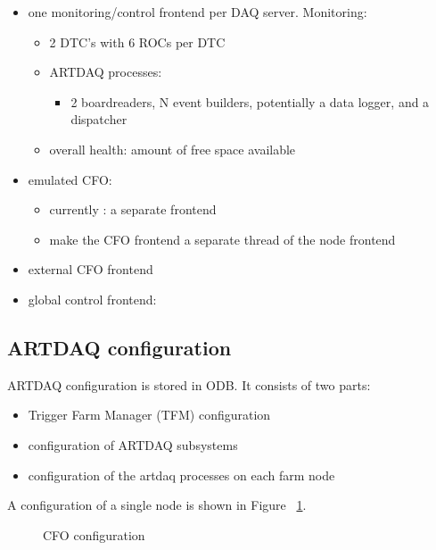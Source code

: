 \begin{itemize}
\item
  one monitoring/control frontend per DAQ server. Monitoring:
  \begin{itemize}
  \item
    2 DTC's with 6 ROCs per DTC
  \item
    ARTDAQ processes:
    \begin{itemize}
    \item
      2 boardreaders, N event builders, potentially a data logger, and a dispatcher
    \end{itemize}
  \item
    overall health: amount of free space available
  \end{itemize}
\item
  emulated CFO:
  \begin{itemize}
  \item
    currently : a separate frontend 
  \item 
    make the CFO frontend a separate thread of the node frontend
  \end{itemize}
\item
  external CFO frontend 
\item
  global control frontend:
\end{itemize}

\subsection{ARTDAQ configuration}

ARTDAQ configuration is stored in ODB. It consists of two parts:
\begin{itemize}
\item
  Trigger Farm Manager (TFM) configuration
\item
  configuration of ARTDAQ subsystems
\item
  configuration of the artdaq processes on each farm node
\end{itemize}

A configuration of a single node is shown in Figure ~\ref{figure:artdaq_configuration}.

\begin{figure}[H]
  \caption{
    \label{figure:artdaq_configuration}
    CFO configuration
  }
\end{figure}


